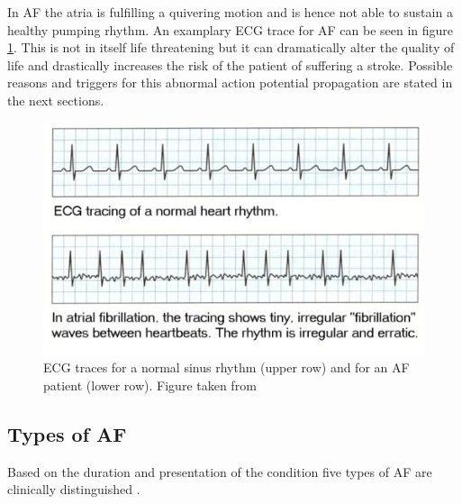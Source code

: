 \documentclass[type=dr, dr=rernat, accentcolor=tud7b,colorbacktitle, bigchapter, openright, twoside, 12pt ]{tudthesis}
\begin{document}
In AF the atria is fulfilling a quivering motion and is hence not able to sustain a healthy pumping rhythm. An examplary ECG trace for AF 
can be seen in figure \ref{af_ecg}. 
This is not in itself life threatening but it can dramatically alter the quality of life and drastically increases the risk of the patient 
of suffering a stroke. Possible reasons and triggers for this abnormal action potential propagation are stated in the next sections.

\begin{figure}[H]
\begin{center}
\includegraphics[scale=3]{AF_ECG.png}
\caption{ECG traces for a normal sinus rhythm (upper row) and for an AF patient (lower row). Figure taken from \cite{afib}}
\label{af_ecg}
\end{center}
\end{figure}

\newpage
\subsection*{Types of AF}

Based on the duration and presentation of the condition five types of AF are clinically distinguished \cite{ESC10} \cite{CE09}.
\end{document}
